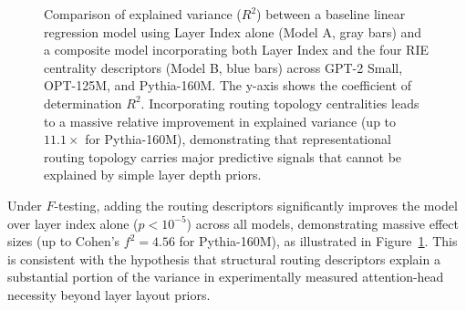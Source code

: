 \documentclass[11pt,a4paper]{article}
\theoremstyle{definition}
\theoremstyle{plain}
\begin{document}
\begin{figure}[t]
\centering
{}
\caption{Comparison of explained variance ($R^2$) between a baseline linear regression model using Layer Index alone (Model A, gray bars) and a composite model incorporating both Layer Index and the four RIE centrality descriptors (Model B, blue bars) across GPT-2 Small, OPT-125M, and Pythia-160M. The y-axis shows the coefficient of determination $R^2$. Incorporating routing topology centralities leads to a massive relative improvement in explained variance (up to $11.1\times$ for Pythia-160M), demonstrating that representational routing topology carries major predictive signals that cannot be explained by simple layer depth priors.}
\label{fig:layer_control}
\end{figure}

Under $F$-testing, adding the routing descriptors significantly improves the model over layer index alone ($p < 10^{-5}$) across all models, demonstrating massive effect sizes (up to Cohen's $f^2 = 4.56$ for Pythia-160M), as illustrated in Figure~\ref{fig:layer_control}. This is consistent with the hypothesis that structural routing descriptors explain a substantial portion of the variance in experimentally measured attention-head necessity beyond layer layout priors.
\end{document}
